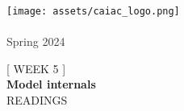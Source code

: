 \documentclass[12pt]{article}
\begin{document}



\thispagestyle{empty} %
\begin{center}
    \texttt{[image: assets/caiac\_logo.png]}\\
    \vspace{0.5em}
    {\Large \textcolor[HTML]{333333}{}}\\
    \vspace{0.5em}
    {\textcolor[HTML]{333333}{Spring 2024}}
    \end{center}

\vspace{8em}

\begin{center}
    [ WEEK 5 ]\\
    \vspace{0.7em}
    {\Huge \textbf{Model internals}}\\
    \vspace{0.7em}
    \uppercase{READINGS}
\end{center}

\vfill  %
\begin{center}
\begin{minipage}{0.8\textwidth}  %
\centering
\end{minipage}
\end{center}

\vspace{2em}  %
\end{document}

